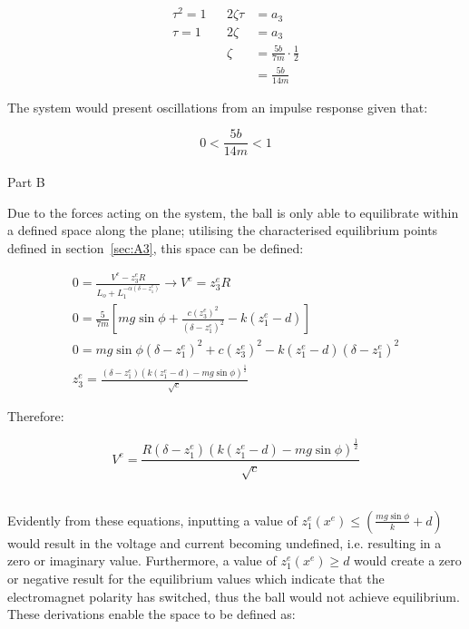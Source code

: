 \documentclass[a4paper,10pt,reqno]{amsart}
\makeatletter
\def\section{\@startsection{section}{1}%
  \z@{.7\linespacing\@plus\linespacing}{.5\linespacing}%
  {\bfseries\scshape\centering}}
\numberwithin{equation}{section}
\makeatother
\begin{document}
\begin{align*}
    \tau^2=1 && 2\zeta\tau&=a_3
    \\
    \tau=1 && 2\zeta&=a_3
    \\
    && \zeta &= \frac{5b}{7m} \cdot \frac{1}{2}
    \\
    && &=\frac{5b}{14m}
\end{align*}

\par The system would present oscillations from an impulse response given that:

\begin{equation}
    0 < \frac{5b}{14m} < 1
\end{equation}
\\

\section{Part B}

\par Due to the forces acting on the system, the ball is only able to equilibrate within a defined space along the plane; utilising the characterised equilibrium points defined in section~\ref{sec:A3}, this space can be defined:

\begin{gather*}
    0=\frac{V^e-z_3^eR}{L_o+L_1^{-\alpha(\delta-z_1^e)}} \rightarrow V^e = z_3^eR
    \\
    0 = \frac{5}{7m}[mg\sin{\phi}+\frac{c(z_3^e)^2}{(\delta-z_1^e)^2}-k(z_1^e-d)]
    \\
    0 = mg\sin{\phi}(\delta-z_1^e)^2 + c(z_3^e)^2 - k(z_1^e-d)(\delta-z_1^e)^2
    \\
    z_3^e = \frac{(\delta-z_1^e)(k(z_1^e-d)-mg\sin{\phi})^\frac{1}{2}}{\sqrt{c}}
\end{gather*}

\par Therefore:

\begin{equation}
\label{eqn:V^e}
    V^e = \frac{R(\delta-z_1^e)(k(z_1^e-d)-mg\sin{\phi})^\frac{1}{2}}{\sqrt{c}}
\end{equation}
\\
\par Evidently from these equations, inputting a value of $z_1^e(x^e) \leq (\frac{mg\sin{\phi}}{k}+d)$ would result in the voltage and current becoming undefined, i.e. resulting in a zero or imaginary value. Furthermore, a value of $z_1^e(x^e) \geq d$ would create a zero or negative result for the equilibrium values which indicate that the electromagnet polarity has switched, thus the ball would not achieve equilibrium. These derivations enable the space to be defined as:
\end{document}
